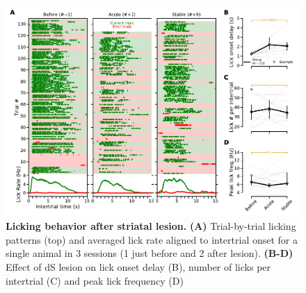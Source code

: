 \begin{figure}[bth!]
  \begin{center}
    \includegraphics[width=1\linewidth]{ch-lesion/figures/Lick.pdf}
    \caption[Licking Behaviora After Striatal Lesion]
    {\textbf{Licking behavior after striatal lesion.}
	\textbf{(A)} Trial-by-trial licking patterns (top) and averaged lick rate aligned to intertrial onset for a single animal in 3 sessions (1 just before and 2 after lesion). 
	\textbf{(B-D)} Effect of dS lesion on lick onset delay (B), number of licks per intertrial (C) and peak lick frequency (D)
	}
	\label{fig:lesion:lick}
  \end{center}
\end{figure}